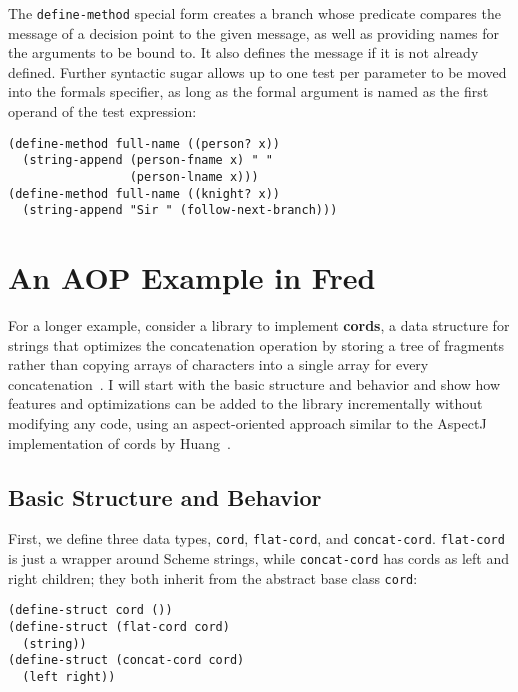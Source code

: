 \documentclass{acm_proc_article-sp}
\newcommand{\defn}[1]{\textbf{#1}}
\newcommand{\code}[1]{\texttt{#1}}
\begin{document}
The \code{define-method} special form creates a branch whose predicate
compares the message of a decision point to the given message, as well
as providing names for the arguments to be bound to.  It also defines
the message if it is not already defined.  Further syntactic sugar
allows up to one test per parameter to be moved into the formals
specifier, as long as the formal argument is named as the first
operand of the test expression:

\begin{verbatim}
(define-method full-name ((person? x))
  (string-append (person-fname x) " "
                 (person-lname x)))
(define-method full-name ((knight? x))
  (string-append "Sir " (follow-next-branch)))
\end{verbatim}

\section{An AOP Example in Fred}
\label{section:cords}

For a longer example, consider a library to implement \defn{cords}, a
data structure for strings that optimizes the concatenation operation
by storing a tree of fragments rather than copying arrays of
characters into a single array for every concatenation~\cite{cords}.
I will start with the basic structure and behavior and show how
features and optimizations can be added to the library incrementally
without modifying any code, using an aspect-oriented approach similar
to the AspectJ implementation of cords by
Huang~\cite{cords-in-AspectJ}.

\subsection{Basic Structure and Behavior}

First, we define three data types, \code{cord}, \code{flat-cord}, and
\code{concat-cord}.  \code{flat-cord} is just a wrapper around Scheme
strings, while \code{concat-cord} has cords as left and right
children; they both inherit from the abstract base class \code{cord}:

\begin{verbatim}
(define-struct cord ())
(define-struct (flat-cord cord)
  (string))
(define-struct (concat-cord cord)
  (left right))
\end{verbatim}
\end{document}
